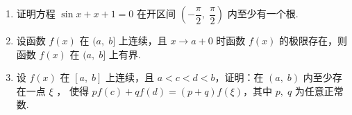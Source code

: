 \begin{enumerate}
    \item 证明方程 $\sin x+x+1=0$ 在开区间 $\left(-\dfrac{\pi}{2},\;\dfrac{\pi}{2}\right)$ 内至少有一个根.
    
    \item 设函数 $f(x)$ 在 $(a,\;b]$ 上连续，且 $x\to a+0$ 时函数 $f(x)$ 的极限存在，则函数 $f(x)$ 在 $(a,\;b]$ 上有界.
    
    \item 设 $f(x)$ 在 $[a,\;b]$ 上连续，且 $a<c<d<b$，证明：在 $(a,\;b)$ 内至少存在一点 $\xi$ ，
    使得 $pf(c)+qf(d)=(p+q)f(\xi)$，其中 $p,\;q$ 为任意正常数.

\end{enumerate}